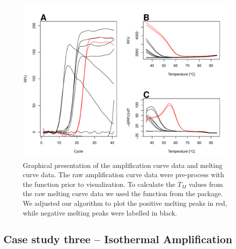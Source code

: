\begin{figure}[htbp]
  \centering
  \includegraphics[clip=true, width=16cm]{figures/amp_melt.pdf}
  \caption{Graphical presentation of the amplification curve data and melting 
curve data.  The raw amplification curve data were pre-process with 
the  function prior to visualization. To calculate the $T_{M}$ values 
from the raw melting curve data  we used the  function 
from the  package.  We adjusted our algorithm to 
plot the positive melting peaks in red, while negative melting peaks were 
labelled in black.} 
\label{figure:amp_melt}
\end{figure}

\subsection{Case study three -- Isothermal Amplification}

